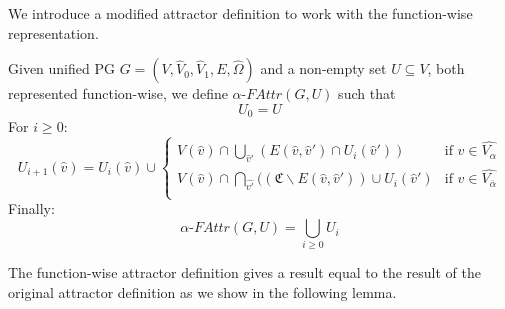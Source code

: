 We introduce a modified attractor definition to work with the function-wise representation.
\begin{definition}
		\label{def_Uattr}Given unified PG $G = (V, \hat{V}_0,\hat{V}_1,E,\hat{\Omega})$ and a non-empty set $U \subseteq V$, both represented function-wise, we define $\alpha\textit{-FAttr}(G,U)$ such that
	\[U_0 = U \]
	For $i \geq 0$:
	\[
	U_{i+1}(\hat{v}) = U_i(\hat{v}) \cup \begin{cases}
V(\hat{v}) \cap \bigcup_{\hat{v}'} (E(\hat{v},\hat{v}') \cap U_i(\hat{v}')) & \text{if } \hat{v} \in \hat{V_{\alpha}}\\
V(\hat{v}) \cap \bigcap_{\hat{v'}}((\mathfrak{C} \backslash E(\hat{v},\hat{v}')) \cup U_i(\hat{v}') & \text{if }\hat{v} \in  \hat{V_{\overline{\alpha}}} \\
	\end{cases}
	\]
	Finally:
	\[\alpha\textit{-FAttr}(G,U) = \bigcup_{i \geq 0} U_i \]
\end{definition}
The function-wise attractor definition gives a result equal to the result of the original attractor definition as we show in the following lemma.
